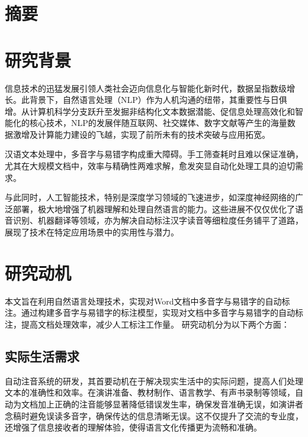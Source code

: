 \documentclass[12pt,hyperref,a4paper,UTF8]{ctexart}
\begin{document}
\cover

%
%

\thispagestyle{empty} %

\newpage
\tableofcontents

\newpage

\section{摘要}
\section{研究背景}
信息技术的迅猛发展引领人类社会迈向信息化与智能化新时代，数据呈指数级增长。此背景下，自然语言处理（NLP）作为人机沟通的纽带，其重要性与日俱增。从计算机科学分支跃升至发掘非结构化文本数据潜能、促信息处理高效化和智能化的核心技术，NLP的发展伴随互联网、社交媒体、数字文献等产生的海量数据激增及计算能力建设的飞越，实现了前所未有的技术突破与应用拓宽。

汉语文本处理中，多音字与易错字构成重大障碍。手工筛查耗时且难以保证准确，尤其在大规模文档中，效率与精确性两难求解，愈发突显自动化处理工具的迫切需求。

与此同时，人工智能技术，特别是深度学习领域的飞速进步，如深度神经网络的广泛部署，极大地增强了机器理解和处理自然语言的能力。这些进展不仅仅优化了语音识别、机器翻译等领域，亦为解决自动标注汉字读音等细粒度任务铺平了道路，展现了技术在特定应用场景中的实用性与潜力。
\section{研究动机}
本文旨在利用自然语言处理技术，实现对Word文档中多音字与易错字的自动标注。通过构建多音字与易错字的标注模型，实现对文档中多音字与易错字的自动标注，提高文档处理效率，减少人工标注工作量。
研究动机分为以下两个方面：
\subsection{实际生活需求}
自动注音系统的研发，其首要动机在于解决现实生活中的实际问题，提高人们处理文本的准确性和效率。在演讲准备、教材制作、语言教学、有声书录制等领域，自动为文档加上正确的注音能够显著降低错误发生率，确保发音准确无误，如演讲者念稿时避免误读多音字，确保传达的信息清晰无误。这不仅提升了交流的专业度，还增强了信息接收者的理解体验，使得语言文化传播更为流畅和准确。
\end{document}
